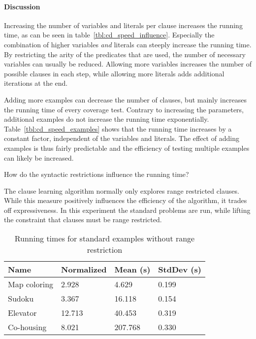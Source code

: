 \paragraph{Discussion}
Increasing the number of variables and literals per clause increases the running time, as can be seen in table~\ref{tbl:cd_speed_influence}.
Especially the combination of higher variables \emph{and} literals can steeply increase the running time.
By restricting the arity of the predicates that are used, the number of necessary variables can usually be reduced.
Allowing more variables increases the number of possible clauses in each step, while allowing more literals adds additional iterations at the end.

Adding more examples can decrease the number of clauses, but mainly increases the running time of every coverage test.
Contrary to increasing the parameters, additional examples do not increase the running time exponentially.
Table~\ref{tbl:cd_speed_examples} shows that the running time increases by a constant factor, independent of the variables and literals.
The effect of adding examples is thus fairly predictable and the efficiency of testing multiple examples can likely be increased.

\begin{question}
	How do the syntactic restrictions influence the running time?
\end{question}

\begin{experiment}
	The clause learning algorithm normally only explores range restricted clauses.
	While this measure positively influences the efficiency of the algorithm, it trades off expressiveness.
	In this experiment the standard problems are run, while lifting the constraint that clauses must be range restricted.

	\begin{table}[!htp]
		\begin{tabularx}{\textwidth}{XXXX}
			\textbf{Name} 	& \textbf{Normalized}	& \textbf{Mean (s)}	& \textbf{StdDev (s)} \\
			\toprule
			Map coloring 	& 2.928					& 4.629				& 0.199 \\
			Sudoku 			& 3.367					& 16.118			& 0.154 \\
			Elevator 		& 12.713				& 40.453 			& 0.319 \\
			Co-housing 		& 8.021					& 207.768			& 0.330
		\end{tabularx}
		\label{tbl:exp_speed_no_range}
		\caption{Running times for standard examples without range restriction}
	\end{table}

\end{experiment}

